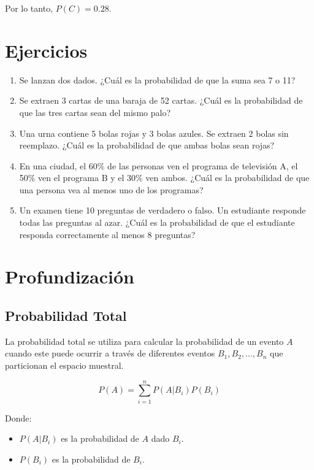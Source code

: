 \documentclass[letterpaper, 12pt]{article}
\begin{document}
	Por lo tanto, $P(C) = \boxed{0.28}$.
	
	\section{Ejercicios}
	
	\begin{enumerate}
		\item Se lanzan dos dados. ¿Cuál es la probabilidad de que la suma sea 7 o 11?
		\item Se extraen 3 cartas de una baraja de 52 cartas. ¿Cuál es la probabilidad de que las tres cartas sean del mismo palo?
		\item Una urna contiene 5 bolas rojas y 3 bolas azules. Se extraen 2 bolas sin reemplazo. ¿Cuál es la probabilidad de que ambas bolas sean rojas?
		\item En una ciudad, el 60\% de las personas ven el programa de televisión A, el 50\% ven el programa B y el 30\% ven ambos. ¿Cuál es la probabilidad de que una persona vea al menos uno de los programas?
		\item Un examen tiene 10 preguntas de verdadero o falso. Un estudiante responde todas las preguntas al azar. ¿Cuál es la probabilidad de que el estudiante responda correctamente al menos 8 preguntas?
	\end{enumerate}
		
	\section{Profundización}
	
	\subsection{Probabilidad Total}
	
	La probabilidad total se utiliza para calcular la probabilidad de un evento $A$ cuando este puede ocurrir a través de diferentes eventos $B_1, B_2, ..., B_n$ que particionan el espacio muestral.
	
	\begin{equation*}
		P(A) = \sum_{i=1}^{n} P(A | B_i) P(B_i)
	\end{equation*}
	
	Donde:
	\begin{itemize}
		\item $P(A | B_i)$ es la probabilidad de $A$ dado $B_i$.
		\item $P(B_i)$ es la probabilidad de $B_i$.
	\end{itemize}
	
\end{document}
